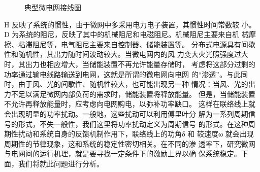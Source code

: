 \documentclass[withoutpreface,bwprint]{cumcmthesis} %
\begin{document}
\begin{figure}[h!t]
    \caption{典型微电网接线图}
    \label{fig3}
    \end{figure}

H 反映了系统的惯性，由于微网中多采用电力电子装置，其惯性时间常数较
小。D 为系统的阻尼，反映了其中的机械阻尼和电磁阻尼。机械阻尼主要来自机
械摩擦、粘滞阻尼等，电气阻尼主要来自控制器、储能装置等。
分布式电源具有间歇性和随机性，其出力随时间波动较大。当微电网内的风
力变大火光照强度过大时，其出力也相应增大，当储能装置不再允许能量存储时，
考虑将这部分过剩的功率通过输电线路输送到电网，这就是所谓的微电网向电网
的“渗透”。与此同时，由于风、光的间歇性、随机性较大，也可能出现另一种
情况：当风、光的出力不足以满足微网内部负荷的需求时，储能装置将释放能量。
但是，当储能装置不允许再释放能量时，应考虑向电网购电，以弥补功率缺口。
这样在联络线上就会出现明显的功率扰动。一般地，这些扰动可以利用傅里叶分
解为一系列周期信号的形式，不失一般性，我们这里将功率扰动定义为周期信号
的形式。在这种周期性扰动和系统自身的反馈机制作用下，联络线上的功角δ 和
较速度ω 就会出现周期性的节律现象，这和系统的稳定性密切相关。在不同的渗
透率下，研究微网与电网间的运行机理，就是要寻找一定条件下的激励上界以确
保系统稳定。下面，我们将就此问题进行分析。
\end{document}
